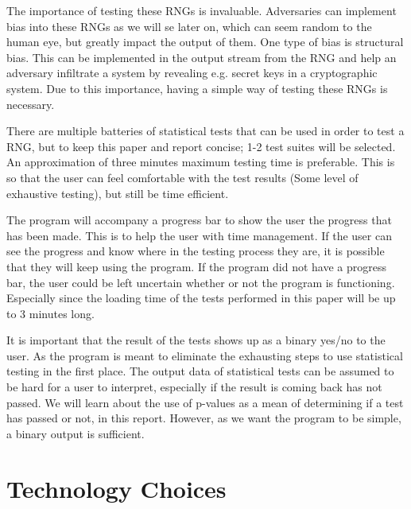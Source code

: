\documentclass[]{final_report}
\begin{document}
\par{The importance of testing these RNGs is invaluable. Adversaries can implement bias into these RNGs as we will se later on, which can seem random to the human eye, but greatly impact the output of them. One type of bias is structural bias. This can be implemented in the output stream from the RNG and help an adversary infiltrate a system by revealing e.g. secret keys in a cryptographic system. Due to this importance, having a simple way of testing these RNGs is necessary.}

\par{There are multiple batteries of statistical tests that can be used in order to test a RNG, but to keep this paper and report concise; 1-2 test suites will be selected. An approximation of three minutes maximum testing time is preferable. This is so that the user can feel comfortable with the test results (Some level of exhaustive testing), but still be time efficient.}

\par{The program will accompany a progress bar to show the user the progress that has been made. This is to help the user with time management. If the user can see the progress and know where in the testing process they are, it is possible that they will keep using the program. If the program did not have a progress bar, the user could be left uncertain whether or not the program is functioning. Especially since the loading time of the tests performed in this paper will be up to 3 minutes long.}

\par{It is important that the result of the tests shows up as a binary yes/no to the user. As the program is meant to eliminate the exhausting steps to use statistical testing in the first place. The output data of statistical tests can be assumed to be hard for a user to interpret, especially if the result is coming back has not passed. We will learn about the use of p-values as a mean of determining if a test has passed or not, in this report. However, as we want the program to be simple, a binary output is sufficient.}

\section*{Technology Choices}
\end{document}
